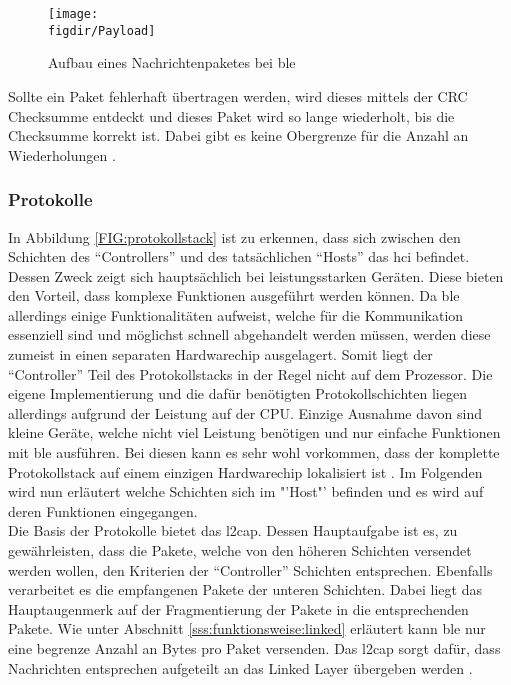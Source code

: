 \begin{figure}[h]
	\centering
	\texttt{[image: \\figdir/Payload]}
	\caption{Aufbau eines Nachrichtenpaketes bei \ac{ble}}
	\label{FIG:payload}
\end{figure}

\noindent Sollte ein Paket fehlerhaft übertragen werden, wird dieses mittels der CRC Checksumme entdeckt und dieses Paket wird so lange wiederholt, bis die Checksumme korrekt ist. Dabei gibt es keine Obergrenze für die Anzahl an Wiederholungen \cite[Seite 23]{Townsend14:GSB}.\\

\subsubsection{Protokolle}
\label{sss:funktionsweise:protocoll}

In Abbildung \ref{FIG:protokollstack} ist zu erkennen, dass sich zwischen den Schichten des "`Controllers"' und des tatsächlichen "`Hosts"' das \ac{hci} befindet. Dessen Zweck zeigt sich hauptsächlich bei leistungsstarken Geräten. Diese bieten den Vorteil, dass komplexe Funktionen ausgeführt werden können. Da \ac{ble} allerdings einige Funktionalitäten aufweist, welche für die Kommunikation essenziell sind und möglichst schnell abgehandelt werden müssen, werden diese zumeist in einen separaten Hardwarechip ausgelagert. Somit liegt der "`Controller"' Teil des Protokollstacks in der Regel nicht auf dem Prozessor. Die eigene Implementierung und die dafür benötigten Protokollschichten liegen allerdings aufgrund der Leistung auf der CPU. Einzige Ausnahme davon sind kleine Geräte, welche nicht viel Leistung benötigen und nur einfache Funktionen mit \ac{ble} ausführen. Bei diesen kann es sehr wohl vorkommen, dass der komplette Protokollstack auf einem einzigen Hardwarechip lokalisiert ist \cite[Seite 24]{Townsend14:GSB}. Im Folgenden wird nun erläutert welche Schichten sich im "'Host"' befinden und es wird auf deren Funktionen eingegangen.\\  

\noindent Die Basis der Protokolle bietet das \ac{l2cap}. Dessen Hauptaufgabe ist es, zu gewährleisten, dass die Pakete, welche von den höheren Schichten versendet werden wollen, den Kriterien der "`Controller"' Schichten entsprechen. Ebenfalls verarbeitet es die empfangenen Pakete der unteren Schichten. Dabei liegt das Hauptaugenmerk auf der Fragmentierung der Pakete in die entsprechenden Pakete. Wie unter Abschnitt \ref{sss:funktionsweise:linked} erläutert kann \ac{ble} nur eine begrenze Anzahl an Bytes pro Paket versenden. Das \ac{l2cap} sorgt dafür, dass Nachrichten entsprechen aufgeteilt an das Linked Layer übergeben werden \cite{TI:WWW}.\\

